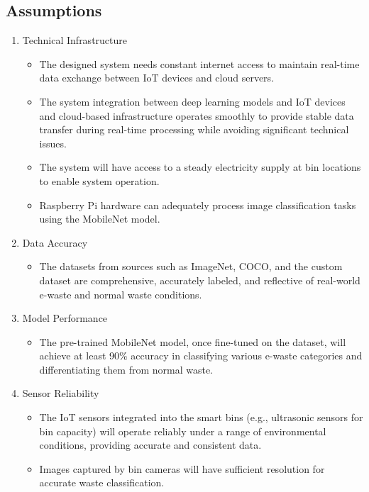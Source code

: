 \subsection{Assumptions}

\begin{enumerate}
\item Technical Infrastructure
	\begin{itemize}
		\item The designed system needs constant internet access to maintain real-time data exchange between IoT devices and cloud servers.
		\item The system integration between deep learning models and IoT devices and cloud-based infrastructure operates smoothly to provide stable data transfer during real-time processing while avoiding significant technical issues.
		\item The system will have access to a steady electricity supply at bin locations to enable system operation.
		\item Raspberry Pi hardware can adequately process image classification tasks using the MobileNet model.
	\end{itemize}

\item Data Accuracy
	\begin{itemize}
		\item The datasets from sources such as ImageNet, COCO, and the custom dataset are comprehensive, accurately labeled, and reflective of real-world e-waste and normal waste conditions.
	\end{itemize}

\item Model Performance
	\begin{itemize}
		\item The pre-trained MobileNet model, once fine-tuned on the dataset, will achieve at least 90\% accuracy in classifying various e-waste categories and differentiating them from normal waste.
	\end{itemize}

\item Sensor Reliability
	\begin{itemize}
		\item The IoT sensors integrated into the smart bins (e.g., ultrasonic sensors for bin capacity) will operate reliably under a range of environmental conditions, providing accurate and consistent data.
		\item Images captured by bin cameras will have sufficient resolution for accurate waste classification.
	\end{itemize}


\end{enumerate}
